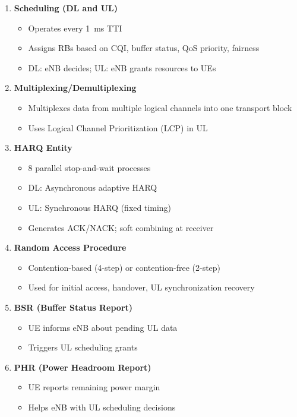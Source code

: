 \begin{enumerate}
\def\labelenumi{\arabic{enumi}.}
\tightlist
\item
  \textbf{Scheduling (DL and UL)}

  \begin{itemize}
  \tightlist
  \item
    Operates every 1~ms TTI
  \item
    Assigns RBs based on CQI, buffer status, QoS priority, fairness
  \item
    DL: eNB decides; UL: eNB grants resources to UEs
  \end{itemize}
\item
  \textbf{Multiplexing/\allowbreak{}Demultiplexing}

  \begin{itemize}
  \tightlist
  \item
    Multiplexes data from multiple logical channels into one transport block
  \item
    Uses Logical Channel Prioritization (LCP) in UL
  \end{itemize}
\item
  \textbf{HARQ Entity}

  \begin{itemize}
  \tightlist
  \item
    8 parallel stop-and-wait processes
  \item
    DL: Asynchronous adaptive HARQ
  \item
    UL: Synchronous HARQ (fixed timing)
  \item
    Generates ACK/\allowbreak{}NACK; soft combining at receiver
  \end{itemize}
\item
  \textbf{Random Access Procedure}

  \begin{itemize}
  \tightlist
  \item
    Contention-based (4-step) or contention-free (2-step)
  \item
    Used for initial access, handover, UL synchronization recovery
  \end{itemize}
\item
  \textbf{BSR (Buffer Status Report)}

  \begin{itemize}
  \tightlist
  \item
    UE informs eNB about pending UL data
  \item
    Triggers UL scheduling grants
  \end{itemize}
\item
  \textbf{PHR (Power Headroom Report)}

  \begin{itemize}
  \tightlist
  \item
    UE reports remaining power margin
  \item
    Helps eNB with UL scheduling decisions
  \end{itemize}
\end{enumerate}

